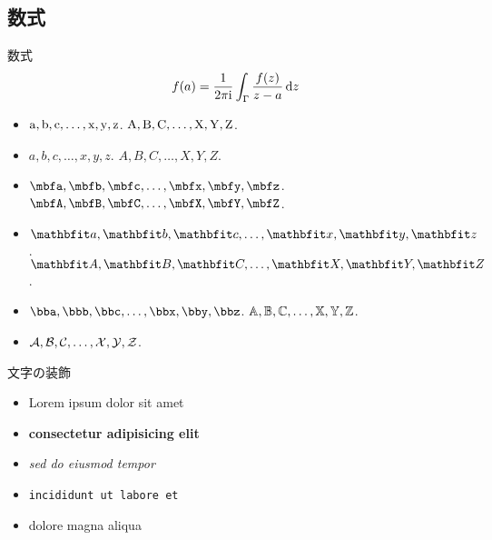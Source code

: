\documentclass[12pt,unicode]{beamer}
\begin{document}
  \subsection{数式}
  \begin{frame}{数式}
    \begin{align}
      f(a) = \frac{1}{2\pi\mathrm{i}} \int_\Gamma \frac{f(z)}{z-a} \dd{z}
    \end{align}
    \begin{itemize}
      \item $\mathrm{a},\mathrm{b},\mathrm{c},\dots,\mathrm{x},\mathrm{y},\mathrm{z}$. $\mathrm{A},\mathrm{B},\mathrm{C},\dots,\mathrm{X},\mathrm{Y},\mathrm{Z}$.
      \item $a,b,c,\dots,x,y,z$. $A,B,C,\dots,X,Y,Z$.
      \item $\bfa,\bfb,\bfc,\dots,\bfx,\bfy,\bfz$. $\bfA,\bfB,\bfC,\dots,\bfX,\bfY,\bfZ$.
      \item $\bma,\bmb,\bmc,\dots,\bmx,\bmy,\bmz$. $\bmA,\bmB,\bmC,\dots,\bmX,\bmY,\bmZ$.
      \item $\bba,\bbb,\bbc,\dots,\bbx,\bby,\bbz$. $\mathbb{A},\mathbb{B},\mathbb{C},\dots,\mathbb{X},\mathbb{Y},\mathbb{Z}$.
      \item $\mathcal{A},\mathcal{B},\mathcal{C},\dots,\mathcal{X},\mathcal{Y},\mathcal{Z}$.
    \end{itemize}
  \end{frame}

  \begin{frame}{文字の装飾}
    \begin{itemize}
      \item Lorem ipsum dolor sit amet
      \item \textbf{consectetur adipisicing elit}
      \item \textit{sed do eiusmod tempor}
      \item \texttt{incididunt ut labore et}
      \item \alert{dolore magna aliqua}
    \end{itemize}
  \end{frame}
\end{document}

